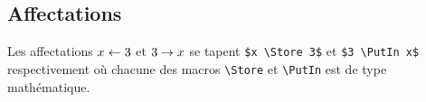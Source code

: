 \documentclass[12pt,a4paper]{article}
\begin{document}

\subsection{Affectations}

Les affectations $x \leftarrow 3$ et $3 \rightarrow x$ se tapent \verb+$x \Store 3$+ et \verb+$3 \PutIn x$+ respectivement où chacune des macros \verb+\Store+ et \verb+\PutIn+ est de type mathématique.
\end{document}
